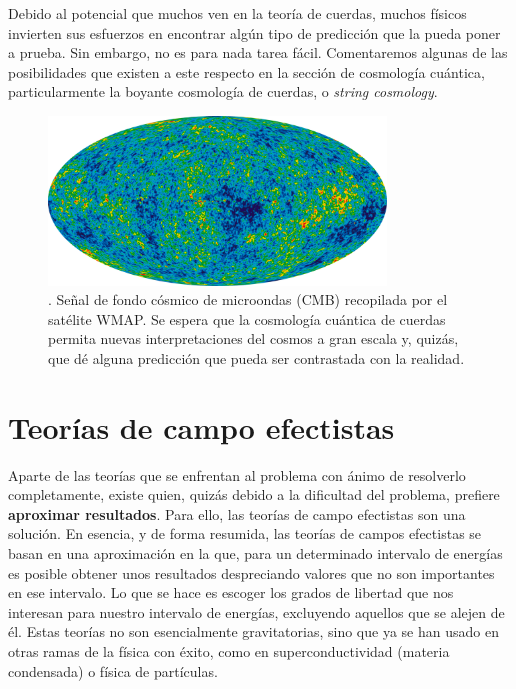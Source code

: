 \documentclass[11pt,a4paper,titlepage]{article}
\begin{document}
Debido al potencial que muchos ven en la teoría de cuerdas, muchos físicos invierten sus esfuerzos en encontrar algún tipo de predicción que la pueda poner a prueba. Sin embargo, no es para nada tarea fácil. Comentaremos algunas de las posibilidades que existen a este respecto en la sección de cosmología cuántica, particularmente la boyante cosmología de cuerdas, o \textit{string cosmology}.

\begin{figure}[h]
	\centering
	\includegraphics[width=0.8\textwidth]{cmb}
	\caption{\cite{cmbbib}. Señal de fondo cósmico de microondas (CMB) recopilada por el satélite WMAP. Se espera que la cosmología cuántica de cuerdas permita nuevas interpretaciones del cosmos a gran escala y, quizás, que dé alguna predicción que pueda ser contrastada con la realidad.}
	\label{cmb}
\end{figure}

%
%
%
%
\newpage
\section{Teorías de campo efectistas} %

Aparte de las teorías que se enfrentan al problema con ánimo de resolverlo completamente, existe quien, quizás debido a la dificultad del problema, prefiere \textbf{aproximar resultados}. Para ello, las teorías de campo efectistas son una solución. En esencia, y de forma resumida, las teorías de campos efectistas se basan en una aproximación en la que, para un determinado intervalo de energías es posible obtener unos resultados despreciando valores que no son importantes en ese intervalo. Lo que se hace es escoger los grados de libertad que nos interesan para nuestro intervalo de energías, excluyendo aquellos que se alejen de él. Estas teorías no son esencialmente gravitatorias, sino que ya se han usado en otras ramas de la física con éxito, como en superconductividad (materia condensada) o física de partículas.
\end{document}
